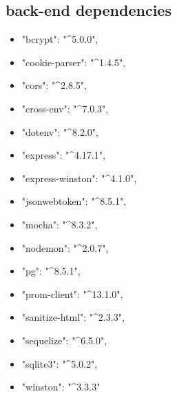 \subsection{back-end dependencies}\label{appendix:back-end-dependencies}
\begin{itemize}
    \item "bcrypt": "\^{}{}5.0.0",
    \item "cookie-parser": "\^{}1.4.5",
    \item "cors": "\^{}2.8.5",
    \item "cross-env": "\^{}7.0.3",
    \item "dotenv": "\^{}8.2.0",
    \item "express": "\^{}4.17.1",
    \item "express-winston": "\^{}4.1.0",
    \item "jsonwebtoken": "\^{}8.5.1",
    \item "mocha": "\^{}8.3.2",
    \item "nodemon": "\^{}2.0.7",
    \item "pg": "\^{}8.5.1",
    \item "prom-client": "\^{}13.1.0",
    \item "sanitize-html": "\^{}2.3.3",
    \item "sequelize": "\^{}6.5.0",
    \item "sqlite3": "\^{}5.0.2",
    \item "winston": "\^{}3.3.3"
\end{itemize}
